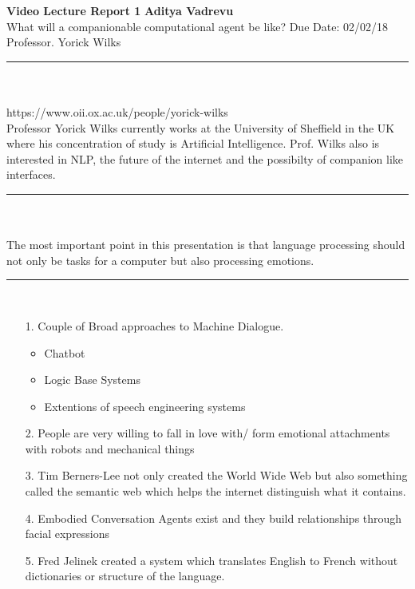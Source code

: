 \documentclass[a4paper, 11pt]{article}
\begin{document}
\noindent
\large\textbf{Video Lecture Report 1} \hfill \textbf{Aditya Vadrevu} \\
What will a companionable computational agent be like? \hfill Due Date: 02/02/18 \\
Professor. Yorick Wilks\\

\noindent\rule{16cm}{0.4pt}\\
\\
https://www.oii.ox.ac.uk/people/yorick-wilks\\
Professor Yorick Wilks currently works at the University of Sheffield in the UK where his concentration of study is Artificial Intelligence. Prof. Wilks also is interested in NLP, the future of the internet and the possibilty of companion like interfaces.

\noindent\rule{16cm}{0.4pt}\\
\\
The most important point in this presentation is that language processing should not only be tasks for a computer but also processing emotions.\\
\noindent\rule{16cm}{0.4pt}\\

\begin{itemize}
\item[1.] Couple of Broad approaches to Machine Dialogue. 
	\begin{itemize}
	\item Chatbot
	\item Logic Base Systems
	\item Extentions of speech engineering systems
	\end{itemize}
\item[2.] People are very willing to fall in love with/ form emotional attachments with robots and mechanical things
\item[3.] Tim Berners-Lee not only created the World Wide Web but also something called the semantic web which helps the internet distinguish what it contains.
\item[4.] Embodied Conversation Agents exist and they build relationships through facial expressions
\item[5.] Fred Jelinek created a system which translates English to French without dictionaries or structure of the language.
\end{itemize}
\end{document}
